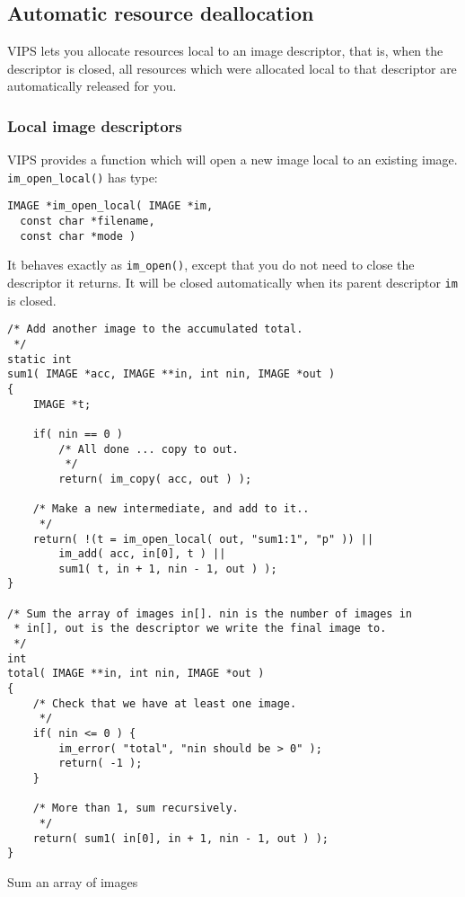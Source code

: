 \subsection{Automatic resource deallocation}

VIPS lets you allocate resources local to an image descriptor, that is,
when the descriptor is closed, all resources which were allocated local to
that descriptor are automatically released for you.

\subsubsection{Local image descriptors}

VIPS provides a function which will open a new image local to
an existing image. \verb+im_open_local()+ has type:

\begin{verbatim}
IMAGE *im_open_local( IMAGE *im, 
  const char *filename, 
  const char *mode )
\end{verbatim}

It behaves exactly as \verb+im_open()+, except that you do not need to close
the descriptor it returns. It will be closed automatically when its parent
descriptor \verb+im+ is closed. 

\begin{fig2}
\begin{verbatim}
/* Add another image to the accumulated total.
 */
static int
sum1( IMAGE *acc, IMAGE **in, int nin, IMAGE *out )
{
    IMAGE *t;

    if( nin == 0 )
        /* All done ... copy to out.
         */
        return( im_copy( acc, out ) );

    /* Make a new intermediate, and add to it..
     */
    return( !(t = im_open_local( out, "sum1:1", "p" )) || 
        im_add( acc, in[0], t ) || 
        sum1( t, in + 1, nin - 1, out ) );
}

/* Sum the array of images in[]. nin is the number of images in
 * in[], out is the descriptor we write the final image to.
 */
int
total( IMAGE **in, int nin, IMAGE *out )
{
    /* Check that we have at least one image.
     */
    if( nin <= 0 ) {
        im_error( "total", "nin should be > 0" );
        return( -1 );
    }

    /* More than 1, sum recursively.
     */
    return( sum1( in[0], in + 1, nin - 1, out ) );
}
\end{verbatim}
\caption{Sum an array of images}
\label{fg:addemup}
\end{fig2}

